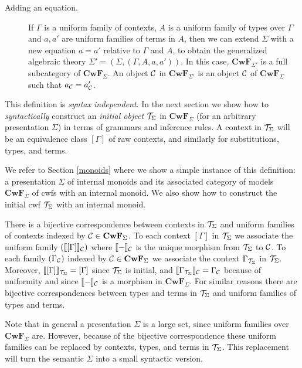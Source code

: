 \documentclass{mscs}
\newcommand{\FYI}[1]{{#1}}
\def\Cwf{\mathbf{CwF}}
\begin{document}
\begin{definition}
\begin{description}
\item[Adding an equation.]
  If $\Gamma$ is a uniform family of contexts,
  $A$ is a uniform family of types over $\Gamma$
  and $a,a'$ are uniform families of terms in $A$,
  then we can extend $\Sigma$ with a new equation $a = a'$ relative to $\Gamma$ and $A$, to obtain
  the generalized algebraic theory $\Sigma' = (\Sigma,(\Gamma,A,a,a'))$.
  In this case,
  $\Cwf_{\Sigma'}$ is a full subcategory of $\Cwf_{\Sigma}$. An object ${\mathcal C}$ in
  $\Cwf_{\Sigma'}$ is an object ${\mathcal C}$ of $\Cwf_\Sigma$ such that $a_{{\mathcal C}} = a'_{{\mathcal C}}$.
\end{description}

\end{definition}

This definition is {\em syntax independent}. In the next section we show how to {\em syntactically} construct an {\em initial object} ${\mathcal T}_{\Sigma}$ in $\Cwf_{\Sigma}$ (for an arbitrary \FYI{presentation} $\Sigma$) in terms of grammars and inference rules. A context in ${\mathcal T}_{\Sigma}$ will be an equivalence class $[ \Gamma ]$ of raw contexts, and similarly for substitutions, types, and terms.

We refer to Section \ref{monoids} where we show a simple instance of this definition: a \FYI{presentation} $\Sigma$ of internal monoids and its associated category of models $\Cwf_\Sigma$ of cwfs with an internal monoid. We also show how to construct the initial cwf  ${\mathcal T}_\Sigma$ with an internal monoid.

\begin{remark}
There is a bijective correspondence between contexts in ${\mathcal T}_\Sigma$ and uniform families of contexts
indexed by $\C \in \Cwf_\Sigma$. To each context $[ \Gamma ]$ in ${\mathcal T}_\Sigma$ we associate the uniform family $(\llbracket  [ \Gamma ]  \rrbracket_{\mathcal C})$ where $\llbracket - \rrbracket_{\mathcal C}$ is the unique morphism from ${\mathcal T}_\Sigma$ to ${\mathcal C}$. To each family $(\Gamma_{\mathcal C})$ indexed by $\C \in \Cwf_\Sigma$ we associate the context $\Gamma_{{\mathcal T}_\Sigma}$ in ${\mathcal T}_\Sigma$. Moreover, $\llbracket  [ \Gamma ]  \rrbracket_{{\mathcal T}_\Sigma} = [ \Gamma ]$ since ${\mathcal T}_\Sigma$ is initial, and  $\llbracket  {\Gamma_{{\mathcal T}_\Sigma}} \rrbracket_{\mathcal C}  = \Gamma_{\mathcal C}$ because of uniformity and since $\llbracket - \rrbracket_{\mathcal C}$ is a morphism in $\Cwf_{\Sigma}$. For similar reasons there are bijective correspondences between types and terms in ${\mathcal T}_\Sigma$ and uniform families of types and terms.
\end{remark}

\begin{remark}
Note that in general a \FYI{presentation} $\Sigma$ is a large set, since uniform families over $\Cwf_\Sigma$ are. However, because of the bijective correspondence these uniform families can be replaced by contexts, types, and terms in ${\mathcal T}_\Sigma$. This replacement will turn the semantic $\Sigma$ into a small syntactic version.
\end{remark}
\end{document}
